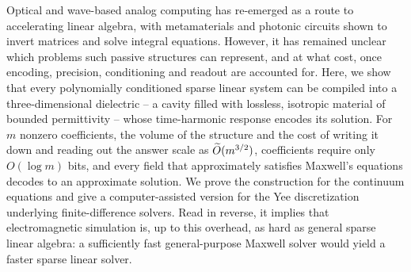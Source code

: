 Optical and wave-based analog computing has re-emerged as a route to
accelerating linear algebra, with metamaterials and photonic circuits shown to
invert matrices and solve integral equations. However, it has remained unclear
which problems such passive structures can represent, and at what cost, once
encoding, precision, conditioning and readout are accounted for. Here, we show
that every polynomially conditioned sparse linear system can be compiled into a
three-dimensional dielectric -- a cavity filled with lossless, isotropic
material of bounded permittivity -- whose time-harmonic response encodes its
solution. For $m$ nonzero coefficients, the volume of the structure and the
cost of writing it down and reading out the answer scale as $\widetilde O(m^{3/2})$,
coefficients require only $O(\log m)$ bits, and every field that approximately
satisfies Maxwell's equations decodes to an approximate solution. We prove the
construction for the continuum equations and give a computer-assisted version
for the Yee discretization underlying finite-difference solvers. Read in reverse, it
implies that electromagnetic simulation is, up to this overhead, as hard as
general sparse linear algebra: a sufficiently fast general-purpose Maxwell
solver would yield a faster sparse linear solver.
